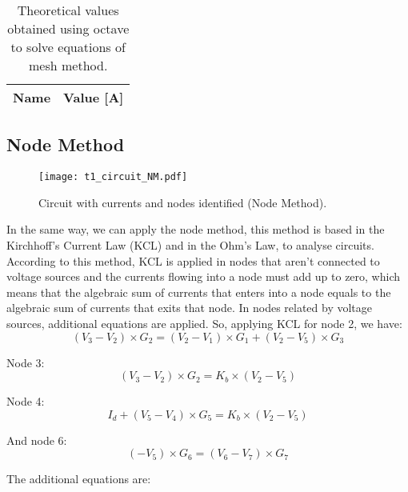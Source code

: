 \begin{table}[h]
  \centering
  \begin{tabular}{|l|r|}
    \hline    
    {\bf Name} & {\bf Value [A]} \\ \hline
    
  \end{tabular}
  \caption{Theoretical values obtained using octave to solve equations of mesh method.}
  \label{tab:MM}
\end{table}

\newpage

\subsection{Node Method}

\begin{figure}[h] \centering
\texttt{[image: t1\_circuit\_NM.pdf]}
\caption{Circuit with currents and nodes identified (Node Method).}
\label{fig:t1_circuit_NM}
\end{figure}

In the same way, we can apply the node method, this method is based in the Kirchhoff's Current Law (KCL) and in the Ohm's Law, to analyse circuits. According to this method, KCL is applied in nodes that aren't connected to voltage sources and the currents flowing into a node must add up to zero, which means that the algebraic sum of currents that enters into a node equals to the algebraic sum of currents that exits that node. In nodes related by voltage sources, additional equations are applied. 
So, applying KCL for node 2, we have:
\begin {equation}
  (V_3 - V_2)\times G_2 = (V_2 - V_1)\times G_1 + (V_2 - V_5)\times G_3
  \label {eq:kvl}
\end{equation}

Node 3:
\begin{equation}
(V_3- V_2)\times G_2 = K_b\times (V_2 - V_5)
  \label {eq:kvl}
\end{equation}

Node 4:
\begin {equation}
I_d + (V_5 - V_4)\times G_5 = K_b\times (V_2 - V_5)
  \label {eq:kvl}
\end{equation}

And node 6:
\begin {equation}
(-V_5)\times G_6 = (V_6 - V_7)\times G_7
  \label {eq:kvl}
\end{equation}

The additional equations are:

